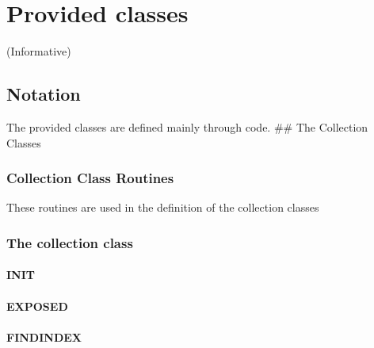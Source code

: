 \chapter{Provided classes}\label{provided-classes}

(Informative)

\section{Notation}\label{notation}

The provided classes are defined mainly through code. \#\# The
Collection Classes

\subsection{Collection Class Routines}\label{collection-class-routines}

These routines are used in the definition of the collection classes



\subsection{The collection class}\label{the-collection-class}



\subsubsection{INIT}\label{init}



\subsubsection{EXPOSED}\label{exposed}



\subsubsection{FINDINDEX}\label{findindex}


